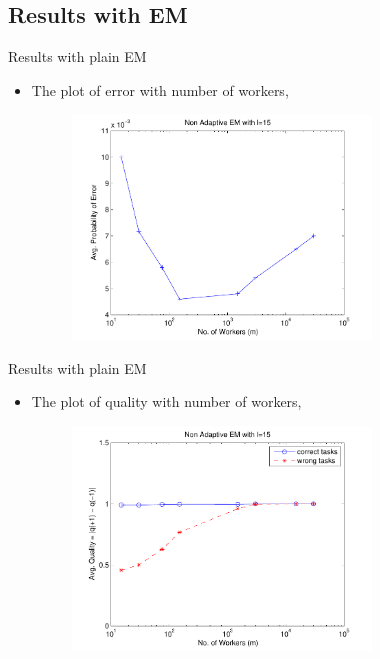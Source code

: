 \documentclass{beamer}
\begin{document}
\subsection{Results with EM}

\begin{frame}{Results with plain EM}
    \begin{itemize}
    \item {
    The plot of error with number of workers,
    \begin{figure}[h!]
   \centering
     \includegraphics[width=0.75\textwidth]{worker_error.pdf}
\end{figure}
    }
    \end{itemize}
\end{frame}

\begin{frame}{Results with plain EM}
    \begin{itemize}
    \item {
    The plot of quality with number of workers,
    \begin{figure}[h!]
   \centering
     \includegraphics[width=0.75\textwidth]{quality_diff2.pdf}
\end{figure}
    }
    \end{itemize}
\end{frame}
\end{document}
